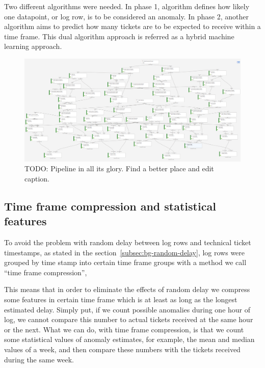 Two different algorithms were needed.
In phase 1,
algorithm defines how likely one datapoint, or log row,
is to be considered an anomaly.
In phase 2,
another algorithm aims to predict
how many tickets are to be expected to receive
within a time frame.
This dual algorithm approach is referred as a hybrid machine learning approach. %


\begin{figure}[htb]
    \centering
    \includegraphics[width=150mm]{./appendices/pipeline-draft}
    \caption{TODO: Pipeline in all its glory. Find a better place and edit caption.
    \label{fig:pipeline draft}}
\end{figure}





\subsection{Time frame compression and statistical features}\label{subsec:pipe-timeframe-compression-and-statistics}
To avoid the problem with random delay
between log rows and technical ticket timestamps,
as stated in the section~\ref{subsec:bg-random-delay},
log rows were grouped by time stamp
into certain time frame groups %
with a method we call \enquote{time frame compression},

This means that
in order to eliminate the effects of random delay
we compress some features in certain time frame
which is at least as long as the longest estimated delay.
Simply put,
if we count possible anomalies during one hour of log,
we cannot compare this number to actual tickets received
at the same hour or the next.
What we can do,
with time frame compression,
is that we count some statistical values of anomaly estimates,
for example, the mean and median values of a week,
and then compare these numbers with the tickets received
during the same week.




